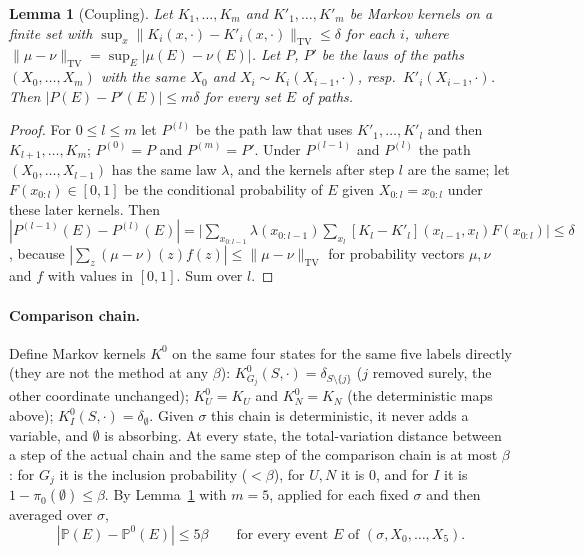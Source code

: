 \documentclass[11pt]{article}
\newtheorem{lemma}[theorem]{Lemma}
\theoremstyle{definition}
\renewcommand{\Pr}{\mathbb P}
\newcommand{\TV}{\mathrm{TV}}
\begin{document}
\begin{lemma}[Coupling]\label{lem:coup}
Let $K_1,\dots,K_m$ and $K'_1,\dots,K'_m$ be Markov kernels on a finite set with $\sup_x\|K_i(x,\cdot)-K'_i(x,\cdot)\|_{\TV}\le\delta$ for each $i$, where $\|\mu-\nu\|_{\TV}=\sup_E|\mu(E)-\nu(E)|$. Let $P$, $P'$ be the laws of the paths $(X_0,\dots,X_m)$ with the same $X_0$ and $X_i\sim K_i(X_{i-1},\cdot)$, resp.\ $K'_i(X_{i-1},\cdot)$. Then $|P(E)-P'(E)|\le m\delta$ for every set $E$ of paths.
\end{lemma}
\begin{proof}
For $0\le l\le m$ let $P^{(l)}$ be the path law that uses $K'_1,\dots,K'_l$ and then $K_{l+1},\dots,K_m$; $P^{(0)}=P$ and $P^{(m)}=P'$. Under $P^{(l-1)}$ and $P^{(l)}$ the path $(X_0,\dots,X_{l-1})$ has the same law $\lambda$, and the kernels after step $l$ are the same; let $F(x_{0:l})\in[0,1]$ be the conditional probability of $E$ given $X_{0:l}=x_{0:l}$ under these later kernels. Then
$|P^{(l-1)}(E)-P^{(l)}(E)|=\big|\sum_{x_{0:l-1}}\lambda(x_{0:l-1})\sum_{x_l}[K_l-K'_l](x_{l-1},x_l)F(x_{0:l})\big|\le\delta$, because $|\sum_z(\mu-\nu)(z)f(z)|\le\|\mu-\nu\|_{\TV}$ for probability vectors $\mu,\nu$ and $f$ with values in $[0,1]$. Sum over $l$.
\end{proof}

\paragraph{Comparison chain.} Define Markov kernels $K^0$ on the same four states for the same five labels directly (they are not the method at any $\beta$): $K^0_{G_j}(S,\cdot)=\delta_{S\setminus\{j\}}$ ($j$ removed surely, the other coordinate unchanged); $K^0_U=K_U$ and $K^0_N=K_N$ (the deterministic maps above); $K^0_I(S,\cdot)=\delta_\emptyset$. Given $\sigma$ this chain is deterministic, it never adds a variable, and $\emptyset$ is absorbing. At every state, the total-variation distance between a step of the actual chain and the same step of the comparison chain is at most $\beta$: for $G_j$ it is the inclusion probability ($<\beta$), for $U,N$ it is $0$, and for $I$ it is $1-\pi_0(\emptyset)\le\beta$. By Lemma~\ref{lem:coup} with $m=5$, applied for each fixed $\sigma$ and then averaged over $\sigma$,
\begin{equation}\label{eq:coup}
|\Pr(E)-\Pr^0(E)|\le5\beta\qquad\text{for every event $E$ of $(\sigma,X_0,\dots,X_5)$}.
\end{equation}
\end{document}
